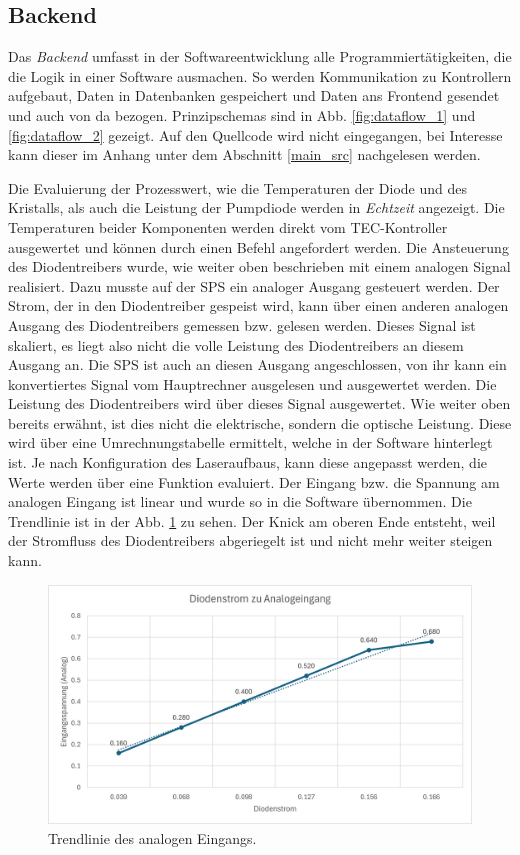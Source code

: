 \subsection{Backend}
\label{chptr:software_backend}
Das \textit{Backend} umfasst in der Softwareentwicklung alle Programmiertätigkeiten, die die Logik in einer Software ausmachen. So werden Kommunikation zu Kontrollern aufgebaut, Daten in Datenbanken gespeichert und Daten ans Frontend gesendet und auch von da bezogen.
Prinzipschemas sind in Abb. \ref{fig:dataflow_1} und \ref{fig:dataflow_2} gezeigt. Auf den Quellcode wird nicht eingegangen, bei Interesse kann dieser im Anhang unter dem Abschnitt \ref{main_src} nachgelesen werden.

Die Evaluierung der Prozesswert, wie die Temperaturen der Diode und des Kristalls, als auch die Leistung der Pumpdiode werden in \textit{Echtzeit} angezeigt.
Die Temperaturen beider Komponenten werden direkt vom TEC-Kontroller ausgewertet und können durch einen Befehl angefordert werden.
Die Ansteuerung des Diodentreibers wurde, wie weiter oben beschrieben mit einem analogen Signal realisiert. Dazu musste auf der SPS ein analoger Ausgang gesteuert werden. Der Strom, der in den Diodentreiber gespeist wird, kann über einen anderen analogen Ausgang des Diodentreibers gemessen bzw. gelesen werden. Dieses Signal ist skaliert, es liegt also nicht die volle Leistung des Diodentreibers an diesem Ausgang an. Die SPS ist auch an diesen Ausgang angeschlossen, von ihr kann ein konvertiertes Signal vom Hauptrechner ausgelesen und ausgewertet werden. Die Leistung des Diodentreibers wird über dieses Signal ausgewertet. Wie weiter oben bereits erwähnt, ist dies nicht die elektrische, sondern die optische Leistung. Diese wird über eine Umrechnungstabelle ermittelt, welche in der Software hinterlegt ist. Je nach Konfiguration des Laseraufbaus, kann diese angepasst werden, die Werte werden über eine Funktion evaluiert.
Der Eingang bzw. die Spannung am analogen Eingang ist linear und wurde so in die Software übernommen. Die Trendlinie ist in der Abb. \ref{fig:trendlinie} zu sehen. Der Knick am oberen Ende entsteht, weil der Stromfluss des Diodentreibers abgeriegelt ist und nicht mehr weiter steigen kann.

\begin{figure}[H]
    \centering
    \includegraphics[scale=0.65]{98_images/analog_2_current_graph.PNG}
    \caption{Trendlinie des analogen Eingangs.}
    \label{fig:trendlinie}
\end{figure}

